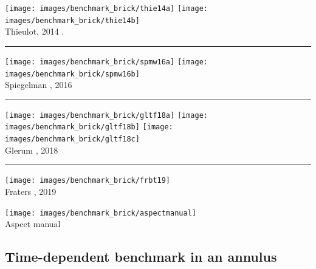 \begin{center}
\texttt{[image: images/benchmark\_brick/thie14a]}
\texttt{[image: images/benchmark\_brick/thie14b]}\\
{\captionfont Thieulot, 2014 \cite{thie14}.}
\end{center}

\begin{center}\noindent\rule{12cm}{0.4pt}\end{center}

\begin{center}
\texttt{[image: images/benchmark\_brick/spmw16a]}
\texttt{[image: images/benchmark\_brick/spmw16b]}\\
{\captionfont Spiegelman \etal, 2016 \cite{spmw16}}
\end{center}

\begin{center}\noindent\rule{12cm}{0.4pt}\end{center}

\begin{center}
\texttt{[image: images/benchmark\_brick/gltf18a]}
\texttt{[image: images/benchmark\_brick/gltf18b]}
\texttt{[image: images/benchmark\_brick/gltf18c]}\\
{\captionfont Glerum \etal, 2018 \cite{gltf18}}
\end{center}

\begin{center}\noindent\rule{12cm}{0.4pt}\end{center}

\begin{center}
\begin{minipage}{0.45\textwidth}
\centering
\texttt{[image: images/benchmark\_brick/frbt19]}\\
{\captionfont Fraters \etal, 2019 \cite{frbt19}}
\end{minipage}\hfill
\begin{minipage}{0.45\textwidth}
\centering
\texttt{[image: images/benchmark\_brick/aspectmanual]}\\
{\captionfont Aspect manual \cite{aspectmanual}}
\end{minipage}
\end{center}


\subsection{Time-dependent benchmark in an annulus}\label{sec:tdba}

